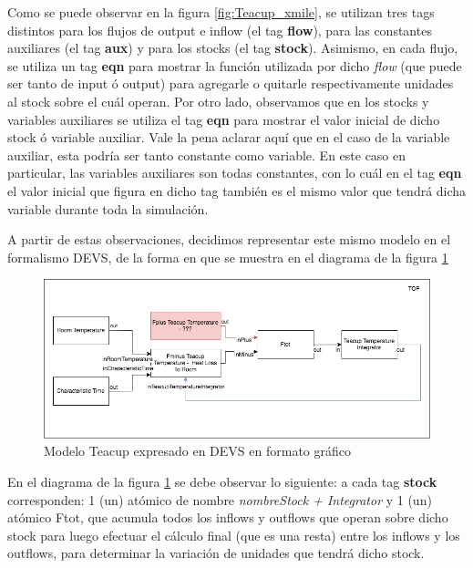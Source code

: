 Como se puede observar en la figura \ref{fig:Teacup_xmile}, se utilizan tres tags distintos para los flujos de output e inflow (el tag \textbf{flow}), para las constantes auxiliares (el tag \textbf{aux}) y para los stocks (el tag \textbf{stock}). Asimismo, en cada flujo, se utiliza un tag \textbf{eqn} para mostrar la función utilizada por dicho \textit{flow} (que puede ser tanto de input ó output) para agregarle o quitarle respectivamente unidades al stock sobre el cuál operan. Por otro lado, observamos que en los stocks y variables auxiliares se utiliza el tag \textbf{eqn} para mostrar el valor inicial de dicho stock ó variable auxiliar. Vale la pena aclarar aquí que en el caso de la variable auxiliar, esta podría ser tanto constante como variable. En este caso en particular, las variables auxiliares son todas constantes, con lo cuál en el tag \textbf{eqn} el valor inicial que figura en dicho tag también es el mismo valor que tendrá dicha variable durante toda la simulación. 

A partir de estas observaciones, decidimos representar este mismo modelo en el formalismo DEVS, de la forma en que se muestra en el diagrama de la figura \ref{fig:Teacup_devs_flattened}

\begin{figure}[!h]
\centering
\includegraphics[scale=0.5]{imagenes/Teacup_devs_flattened}
\caption{Modelo Teacup expresado en DEVS en formato gráfico}
\label{fig:Teacup_devs_flattened}
\end{figure}

En el diagrama de la figura \ref{fig:Teacup_devs_flattened} se debe observar lo siguiente: a cada tag \textbf{stock} corresponden: 1 (un) atómico de nombre \textit{nombreStock + Integrator} y 1 (un) atómico Ftot, que acumula todos los inflows y outflows que operan sobre dicho stock para luego efectuar el cálculo final (que es una resta) entre los inflows y los outflows, para determinar la variación de unidades que tendrá dicho stock. 

